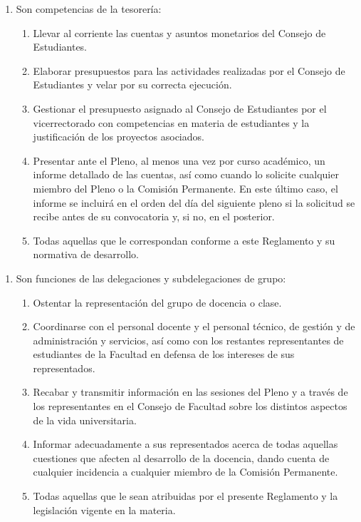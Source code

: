 \documentclass[11pt,a4paper]{article}
\begin{document}
\begin{enumerate}
\item Son competencias de la tesorería:
  \begin{enumerate}
    \item Llevar al corriente las cuentas y asuntos monetarios del Consejo de Estudiantes.
    \item Elaborar presupuestos para las actividades realizadas por el Consejo de Estudiantes y velar por su correcta ejecución.
    \item Gestionar el presupuesto asignado al Consejo de Estudiantes por el vicerrectorado con competencias en materia de estudiantes y la justificación de los proyectos asociados.
    \item Presentar ante el Pleno, al menos una vez por curso académico, un informe detallado de las cuentas, así como cuando lo solicite cualquier miembro del Pleno o la Comisión Permanente. En este último caso, el informe se incluirá en el orden del día del siguiente pleno si la solicitud se recibe antes de su convocatoria y, si no, en el posterior.
    \item Todas aquellas que le correspondan conforme a este Reglamento y su normativa de desarrollo.
  \end{enumerate}
\end{enumerate}


\begin{enumerate}
\item Son funciones de las delegaciones y subdelegaciones de grupo:
  \begin{enumerate}
    \item Ostentar la representación del grupo de docencia o clase.
    \item Coordinarse con el personal docente y el personal técnico, de gestión y de administración y servicios, así como con los restantes representantes de estudiantes de la Facultad en defensa de los intereses de sus representados.
    \item Recabar y transmitir información en las sesiones del Pleno y a través de los representantes en el Consejo de Facultad sobre los distintos aspectos de la vida universitaria.
    \item Informar adecuadamente a sus representados acerca de todas aquellas cuestiones que afecten al desarrollo de la docencia, dando cuenta de cualquier incidencia a cualquier miembro de la Comisión Permanente.
    \item Todas aquellas que le sean atribuidas por el presente Reglamento y la legislación vigente en la materia.
  \end{enumerate}
\end{enumerate}
\end{document}
